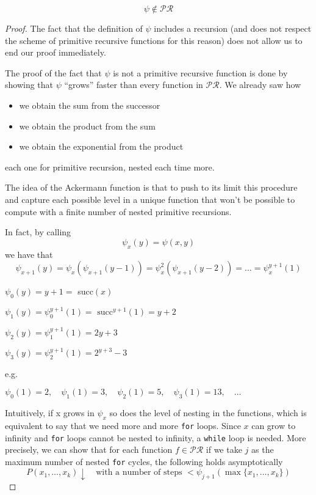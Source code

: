 \begin{theorem}
  \[ \psi \notin \mathcal{PR} \]
  \begin{proof}
    The fact that the definition of $\psi$ includes a recursion (and
    does not respect the scheme of primitive recursive functions for
    this reason) does not allow us to end our proof immediately.

    The proof of the fact that $\psi$ is not a primitive recursive
    function is done by showing that $\psi$ ``grows'' faster than
    every function in $\mathcal{PR}$. We already saw how
    \begin{itemize}
    \item we obtain the sum from the successor
    \item we obtain the product from the sum
    \item we obtain the exponential from the product
    \end{itemize}
    each one for primitive recursion, nested each time more.

    The idea of the Ackermann function is that to push to its limit
    this procedure and capture each possible level in a unique
    function that won't be possible to compute with a finite number of
    nested primitive recursions.

    In fact, by calling \[\psi_x(y) = \psi(x,y)\] we have
    that
    \[
      \psi_{x+1}(y) = \psi_x(\psi_{x+1}(y-1)) =
      \psi^2_{x}(\psi_{x+1}(y-2)) = \dots = \psi_x^{y+1}(1)
    \]

    \(\psi_0(y) = y+1 = \) succ$(x)$

    \(\psi_1(y) = \psi_0^{y+1}(1) = \text{ succ}^{y+1}(1) = y+2\)

    \(\psi_2(y) = \psi_1^{y+1}(1) = 2y+3\)

    \(\psi_3(y) = \psi_2^{y+1}(1) = 2^{y+3}-3\)

    e.g.

    \(\psi_0(1) = 2, \quad \psi_1(1) = 3, \quad \psi_2(1) = 5, \quad
    \psi_3(1) = 13, \quad \dots\)

    Intuitively, if x grows in $\psi_x$ so does the level of nesting
    in the functions, which is equivalent to say that we need more and
    more \texttt{for} loops. Since $x$ can grow to infinity and
    \texttt{for} loops cannot be nested to infinity, a \texttt{while}
    loop is needed. More precisely, we can show that for each
    function $f \in \mathcal{PR}$ if we take $j$ as the maximum number of
    nested \texttt{for} cycles, the following holds asymptotically
    \[
      P(x_1, \dots, x_k)\downarrow \quad \text{with a number of steps }
      < \psi_{j+1}(\max\{x_1, \dots, x_k\})
    \]


\end{proof}
\end{theorem}
